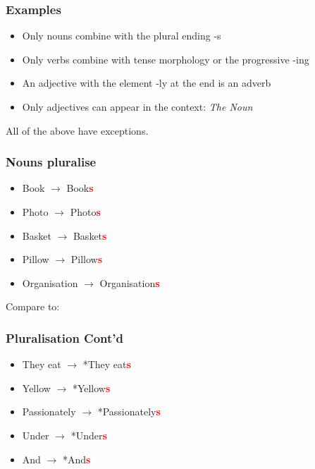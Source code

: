 \begin{frame}
  \frametitle{Examples}

  \begin{itemize}
  \item Only nouns combine with the plural ending -s
  \item Only verbs combine with tense morphology or the progressive -ing
  \item An adjective with the element -ly at the end is an adverb
  \item Only adjectives can appear in the context: \textit{ The \underline{\hspace*{1cm}} Noun }
  \end{itemize}

\pause

All of the above have exceptions.


\end{frame}

\begin{frame}
  \frametitle{Nouns pluralise}

  \begin{itemize}
  \item Book $\rightarrow$ Book\textcolor{red}{\textbf{s}}
  \item Photo $\rightarrow$ Photo\textcolor{red}{\textbf{s}}
  \item Basket $\rightarrow$ Basket\textcolor{red}{\textbf{s}}
  \item Pillow $\rightarrow$ Pillow\textcolor{red}{\textbf{s}}
  \item Organisation $\rightarrow$ Organisation\textcolor{red}{\textbf{s}}

  \end{itemize}

Compare to:

\end{frame}

\begin{frame}
\frametitle{Pluralisation Cont'd}

  \begin{itemize}
  \item They eat $\rightarrow$ *They eat\textcolor{red}{\textbf{s}}
  \item Yellow $\rightarrow$ *Yellow\textcolor{red}{\textbf{s}}
  \item Passionately $\rightarrow$ *Passionately\textcolor{red}{\textbf{s}}
  \item Under $\rightarrow$ *Under\textcolor{red}{\textbf{s}}
  \item And $\rightarrow$ *And\textcolor{red}{\textbf{s}}

  \end{itemize}

\end{frame}

